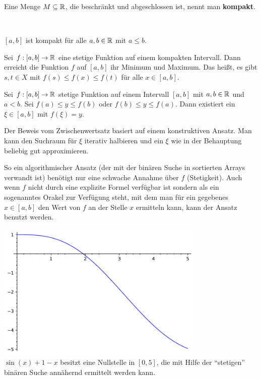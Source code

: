\begin{defn} 
	Eine Menge $M \subseteq \mathbb{R}$, die beschränkt und abgeschlossen ist, nennt man \textbf{kompakt}. 
\end{defn} 

\begin{bsp} { \ } 
	\begin{enuma}
		\item $[a,b]$ ist kompakt für alle $a,b \in \mathbb{R}$ mit $a \le b$. 
	\end{enuma} 
\end{bsp} 

\begin{thm}
	Sei $f : [a,b] \to \mathbb{R}$ eine stetige Funktion auf einem kompakten Intervall. Dann erreicht die Funktion $f$ auf $[a,b]$ ihr Minimum und Maximum. Das heißt, es gibt $s,t \in X$ mit $f(s) \le f(x) \le f(t)$ für alle $x \in [a,b]$. 
\end{thm} 

\begin{thm}[Zwischenwertsatz] 
	Sei $f : [a,b] \to \mathbb{R}$ stetige Funktion auf einem  Intervall $[a,b]$ mit $a,b \in \mathbb{R}$ und $a<b$. Sei $f(a) \le y \le f(b)$ oder $f(b) \le y \le f(a)$. Dann existiert ein $\xi \in [a,b]$ mit $f(\xi) = y$. 
\end{thm}

\begin{bem} 
	Der Beweis vom Zwischenwertsatz basiert auf einem konstruktiven Ansatz. Man kann den Suchraum für $\xi$ iterativ halbieren und ein $\xi$ wie in der Behauptung beliebig gut approximieren. 
	
	
	
	So ein algorithmischer Ansatz (der mit der binären Suche in sortierten Arrays verwandt ist) benötigt nur eine schwache Annahme über $f$ (Stetigkeit). Auch wenn $f$ nicht durch eine explizite Formel verfügbar ist sondern als ein sogenanntes Orakel zur Verfügung steht, mit dem man für ein gegebenes $x \in [a,b]$ den Wert von $f$ an der Stelle $x$ ermitteln kann, kann der Ansatz benutzt werden. 
	
	\begin{center}
	\includegraphics[width=10cm]{pics/continuous_binary_search_ex.pdf} 
	\\
	$\sin(x) + 1 - x$ besitzt eine Nullstelle in $[0,5]$, die mit Hilfe der ``stetigen'' binären Suche annähernd ermittelt werden kann. 
\end{center} 

\end{bem} 

